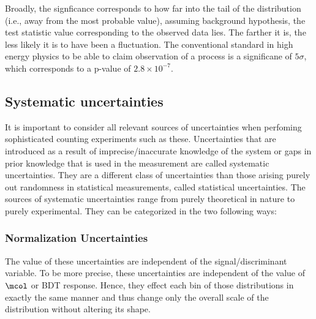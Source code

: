 Broadly, the signficance corresponds to how far into the tail of the distribution (i.e., away from the most probable value), assuming background hypothesis, the test statistic value corresponding to the observed data lies. The farther it is, the less likely it is to have been a fluctuation. The conventional standard in high energy physics to be able to claim observation of a process is a significane of $5\sigma$, which corresponds to a p-value of $2.8\times 10^{-7}$.


\subsection{Systematic uncertainties}
\label{exp_uncert}
It is important to consider all relevant sources of uncertainties when perfoming sophisticated counting experiments such as these. Uncertainties that are introduced as a result of imprecise/inaccurate knowledge of the system or gaps in prior knowledge that is used in the measurement are called systematic uncertainties. They are a different class of uncertainties than those arising purely out randomness in statistical measurements, called statistical uncertainties. The sources of systematic uncertainties range from purely theoretical in nature to purely experimental. They can be categorized in the two following ways:
\subsubsection{Normalization Uncertainties}
The value of these uncertainties are independent of the signal/discriminant variable. To be more precise, these uncertainties are independent of the value of $\mcol$ or BDT response. Hence, they effect each bin of those distributions in exactly the same manner and thus change only the overall scale of the distribution without altering its shape.


